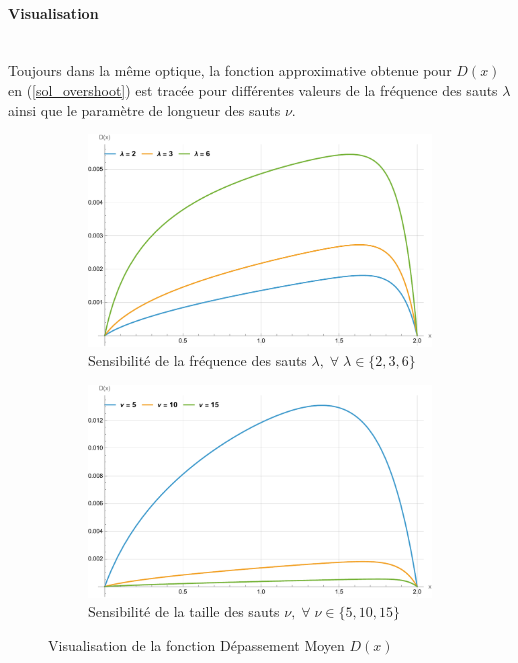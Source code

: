 \paragraph{Visualisation}\phantom{}\\
Toujours dans la même optique, la fonction approximative obtenue pour $D(x)$ en (\ref{sol_overshoot}) est tracée pour différentes valeurs de la fréquence des sauts $\lambda$ ainsi que le paramètre de longueur des sauts $\nu$.
\begin{figure}[htb]
    \centering
    \begin{subfigure}{0.49\linewidth}
        \includegraphics[width=\linewidth]{img/validation/Ovs/overshoot_lambda.pdf}
        \caption{Sensibilité de la fréquence des sauts $\lambda,\;\forall\;\lambda\in\{2,3,6\}$}\label{fig:Overshoot_lambda_visualisation}
    \end{subfigure}
    \hfill
    \begin{subfigure}{0.49\linewidth}
        \includegraphics[width=\linewidth]{img/validation/Ovs/overshoot_nu.pdf}
        \caption{Sensibilité de la taille des sauts $\nu,\;\forall\;\nu\in\{5,10,15\}$}\label{fig:Overshoot_nu_visualisation}
    \end{subfigure}
    \hfill
    \caption{Visualisation de la fonction Dépassement Moyen $D(x)$}\label{fig:AreaVisualisation}
\end{figure}
